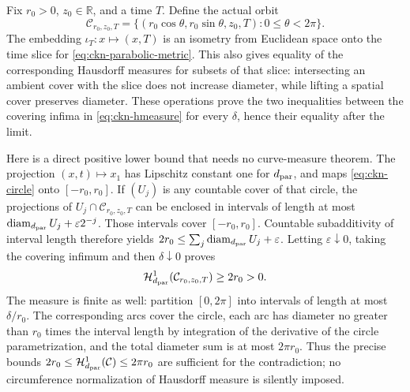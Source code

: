 Fix $r_0>0$, $z_0\in\mathbb R$, and a time $T$. Define the actual orbit
\begin{equation}\label{eq:ckn-circle}
 \mathcal C_{r_0,z_0,T}=
 \{(r_0\cos\theta,r_0\sin\theta,z_0,T):0\leq\theta<2\pi\}.
\end{equation}
The embedding $\iota_T:x\mapsto(x,T)$ is an isometry from Euclidean
space onto the time slice for \eqref{eq:ckn-parabolic-metric}.
This also gives equality of the corresponding Hausdorff measures for
subsets of that slice: intersecting an ambient cover with the slice
does not increase diameter, while lifting a spatial cover preserves
diameter. These operations prove the two inequalities between the
covering infima in \eqref{eq:ckn-hmeasure} for every $\delta$, hence
their equality after the limit.

Here is a direct positive lower bound that needs no curve-measure theorem.
The projection $(x,t)\mapsto x_1$ has Lipschitz constant one for
$d_{\rm par}$, and maps \eqref{eq:ckn-circle} onto $[-r_0,r_0]$.
If $(U_j)$ is any countable cover of that circle, the projections of
$U_j\cap\mathcal C_{r_0,z_0,T}$ can be enclosed in intervals of length
at most $\mathop{\rm diam}_{d_{\rm par}}U_j+\varepsilon2^{-j}$.
Those intervals cover $[-r_0,r_0]$. Countable subadditivity of interval
length therefore yields
$2r_0\leq\sum_j\mathop{\rm diam}_{d_{\rm par}}U_j+\varepsilon$.
Letting $\varepsilon\downarrow0$, taking the covering infimum and then
$\delta\downarrow0$ proves
\begin{equation}\label{eq:ckn-circle-positive}
 \mathcal H^1_{d_{\rm par}}(\mathcal C_{r_0,z_0,T})\geq2r_0>0.
\end{equation}
The measure is finite as well: partition $[0,2\pi]$ into intervals of
length at most $\delta/r_0$. The corresponding arcs cover the circle,
each arc has diameter no greater than $r_0$ times the interval length
by integration of the derivative of the circle parametrization, and
the total diameter sum is at most $2\pi r_0$. Thus the precise bounds
$2r_0\leq\mathcal H^1_{d_{\rm par}}(\mathcal C)\leq2\pi r_0$
are sufficient for the contradiction; no circumference normalization
of Hausdorff measure is silently imposed.

